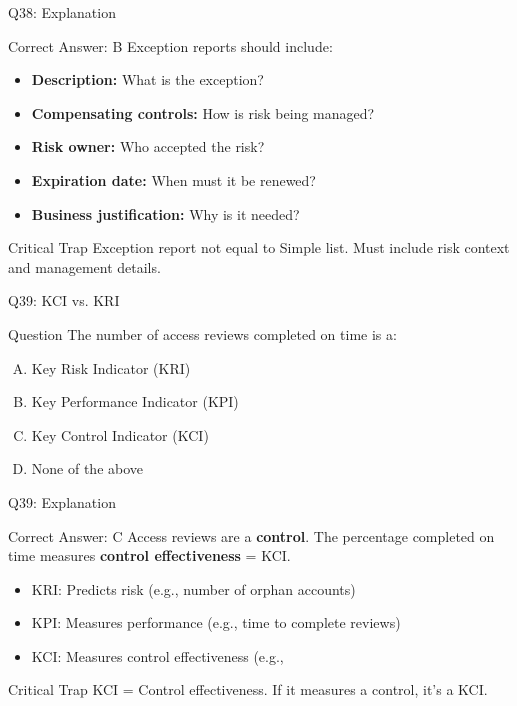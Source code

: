 \documentclass{beamer}
\begin{document}
	\begin{frame}{Q38: Explanation}
		\begin{block}{Correct Answer: B}
			Exception reports should include:
			\begin{itemize}
				\item \textbf{Description:} What is the exception?
				\item \textbf{Compensating controls:} How is risk being managed?
				\item \textbf{Risk owner:} Who accepted the risk?
				\item \textbf{Expiration date:} When must it be renewed?
				\item \textbf{Business justification:} Why is it needed?
			\end{itemize}
		\end{block}
		\begin{alertblock}{Critical Trap}
			Exception report not equal to Simple list.
			Must include risk context and management details.
		\end{alertblock}
	\end{frame}
	
	\begin{frame}{Q39: KCI vs. KRI}
		\begin{block}{Question}
			The number of access reviews completed on time is a:
		\end{block}
		\begin{enumerate}[(A)]
			\item Key Risk Indicator (KRI)
			\item Key Performance Indicator (KPI)
			\item Key Control Indicator (KCI)
			\item None of the above
		\end{enumerate}
	\end{frame}
	
	\begin{frame}{Q39: Explanation}
		\begin{block}{Correct Answer: C}
			Access reviews are a \textbf{control}. The percentage completed on time measures \textbf{control effectiveness} = KCI.
			\begin{itemize}
				\item KRI: Predicts risk (e.g., number of orphan accounts)
				\item KPI: Measures performance (e.g., time to complete reviews)
				\item KCI: Measures control effectiveness (e.g., %
			\end{itemize}
		\end{block}
		\begin{alertblock}{Critical Trap}
			KCI = Control effectiveness.
			If it measures a control, it's a KCI.
		\end{alertblock}
	\end{frame}
	
\end{document}
